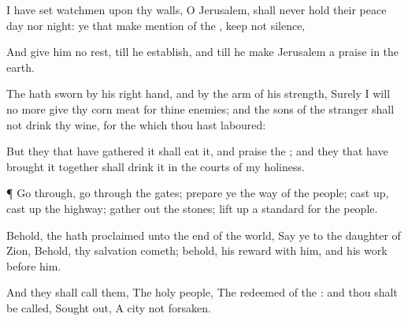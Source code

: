 {\par }{\PP {}I have
set
watchmen upon thy
walls, O
Jerusalem,
{} shall
never hold their
peace
day nor
night: ye that make
mention of the
{}, keep not
silence,

And
give him no
rest, till he
establish, and till he
make
Jerusalem a
praise in the
earth.

The
{} hath
sworn by his right
hand, and by the
arm of his
strength, Surely I
will no more
give thy
corn
{}
meat for thine
enemies; and the
sons of the
stranger shall not
drink thy
wine, for the which thou hast
laboured:

But they that have
gathered it shall
eat it, and
praise the
{}; and they that have brought it
together shall
drink it in the
courts of my
holiness.


\par }{\PP {}¶ Go
through, go
through the
gates;
prepare ye the
way of the
people; cast
up, cast
up the
highway; gather
out the
stones; lift
up a
standard for the
people.

Behold, the
{} hath
proclaimed unto the
end of the
world,
Say ye to the
daughter of
Zion, Behold, thy
salvation
cometh; behold, his
reward
{} with him, and his
work
before him.

And they shall
call them, The
holy
people, The
redeemed of the
{}: and thou shalt be
called, Sought
out, A
city not
forsaken.




\par }
